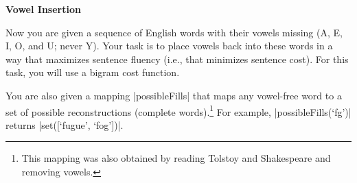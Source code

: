 \item {\bf Vowel Insertion}

Now you are given a sequence of English words with their vowels missing (A, E,
I, O, and U; never Y).  Your task is to place vowels back into these words in a
way that maximizes sentence fluency (i.e., that minimizes sentence cost).  For
this task, you will use a bigram cost function.

You are also given a mapping |possibleFills| that maps any vowel-free word to a
set of possible reconstructions (complete words).\footnote{This mapping was also
obtained by reading Tolstoy and Shakespeare and removing vowels.} For example,
|possibleFills(`fg')| returns |set([`fugue', `fog'])|.

\begin{enumerate}

  

  

\end{enumerate}
